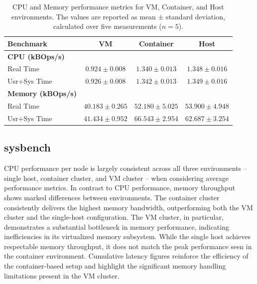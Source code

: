 \begin{table}[htbp]
    \centering
    \begin{tabular}{lccc}
    \toprule
    \textbf{Benchmark} & \textbf{VM} & \textbf{Container} & \textbf{Host} \\
    \midrule
    \textbf{CPU (kBOps/s)} & & & \\
    Real Time & $0.924 \pm 0.008$ & $1.340 \pm 0.013$ & $1.348 \pm 0.016$ \\
    Usr+Sys Time & $0.926 \pm 0.008$ & $1.342 \pm 0.013$ & $1.349 \pm 0.016$ \\
    \midrule
    \textbf{Memory (kBOps/s)} & & & \\
    Real Time & $40.183 \pm 0.265$ & $52.180 \pm 5.025$ & $53.900 \pm 4.948$ \\
    Usr+Sys Time & $41.434 \pm 0.952$ & $66.543 \pm 2.954$ & $62.687 \pm 3.254$ \\
    \bottomrule
    \end{tabular}
    \caption{CPU and Memory performance metrics for VM, Container, and Host environments. The values are reported as mean ± standard deviation, calculated over five measurements ($n = 5$).}
    \label{tab:stress-ng}
\end{table}


\subsection{sysbench}


CPU performance per node is largely consistent across all three environments -- single host, container cluster, and VM cluster -- when considering average performance metrics. In contrast to CPU performance, memory throughput shows marked differences between environments. The container cluster consistently delivers the highest memory bandwidth, outperforming both the VM cluster and the single-host configuration. The VM cluster, in particular, demonstrates a substantial bottleneck in memory performance, indicating inefficiencies in its virtualized memory subsystem. While the single host achieves respectable memory throughput, it does not match the peak performance seen in the container environment. Cumulative latency figures reinforce the efficiency of the container-based setup and highlight the significant memory handling limitations present in the VM cluster.

